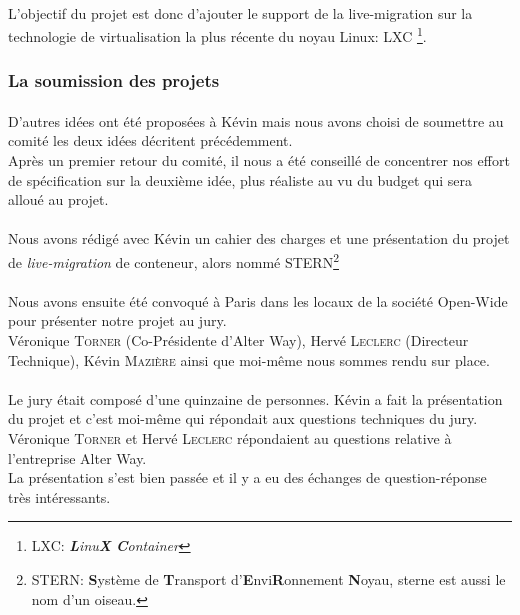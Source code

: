 \paragraph*{}
L'objectif du projet est donc d'ajouter le support de la live-migration sur la technologie de virtualisation la plus récente du noyau Linux: LXC
\footnote{LXC: \emph{\textbf{L}inu\textbf{X} \textbf{C}ontainer}}.


\subsubsection{La soumission des projets}
\paragraph*{}
D'autres idées ont été proposées à Kévin mais nous avons choisi de soumettre au comité les deux idées décritent précédemment.
\\
Après un premier retour du comité, il nous a été conseillé de concentrer nos effort de spécification sur la deuxième idée, plus réaliste au vu du budget qui sera alloué au projet.

\paragraph*{}
Nous avons rédigé avec Kévin un cahier des charges et une présentation du projet de \emph{live-migration} de conteneur, alors nommé STERN\footnote{STERN:
\textbf{S}ystème de \textbf{T}ransport d'\textbf{E}nvi\textbf{R}onnement \textbf{N}oyau, sterne est aussi le nom d'un oiseau.}

\paragraph*{}
Nous avons ensuite été convoqué à Paris dans les locaux de la société Open-Wide pour présenter notre projet au jury.
\\
Véronique \textsc{Torner} (Co-Présidente d'Alter Way), Hervé \textsc{Leclerc} (Directeur Technique), Kévin \textsc{Mazière} ainsi que moi-même nous sommes rendu sur place.

\paragraph*{}
Le jury était composé d'une quinzaine de personnes. Kévin a fait la présentation du projet et c'est moi-même qui répondait aux questions techniques du jury. Véronique \textsc{Torner}
et Hervé \textsc{Leclerc} répondaient au questions relative à l'entreprise Alter Way.
\\
La présentation s'est bien passée et il y a eu des échanges de question-réponse très intéressants.


